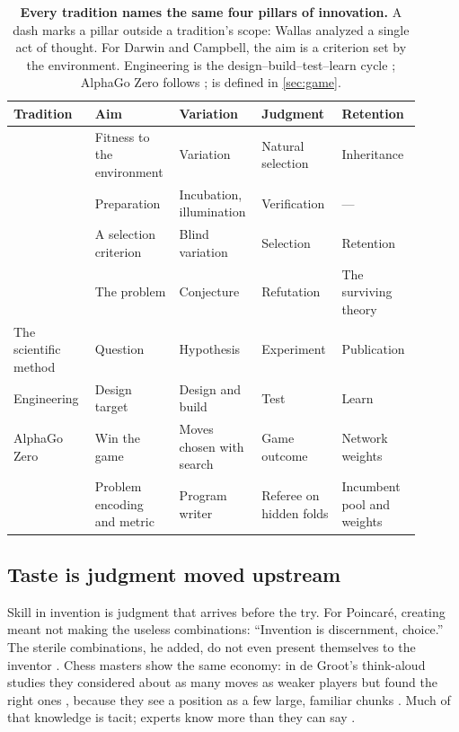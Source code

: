 \begin{table}[t]
  \caption{\textbf{Every tradition names the same four pillars of innovation.} A dash marks a pillar outside a tradition's scope: Wallas analyzed a single act of thought. For Darwin and Campbell, the aim is a criterion set by the environment. Engineering is the design--build--test--learn cycle \citep{nielsen2016engineering}; AlphaGo Zero follows \citet{silver2017mastering}; \EZ{} is defined in \cref{sec:game}.}
  \label{tab:pillars}
  \centering
  \footnotesize
  \begin{tabular}{@{}>{\raggedright\arraybackslash}p{0.19\linewidth}>{\raggedright\arraybackslash}p{0.18\linewidth}>{\raggedright\arraybackslash}p{0.17\linewidth}>{\raggedright\arraybackslash}p{0.17\linewidth}>{\raggedright\arraybackslash}p{0.185\linewidth}@{}}
    \toprule
    Tradition & Aim & Variation & Judgment & Retention \\
    \midrule
    \citet{darwin1859origin} & Fitness to the environment & Variation & Natural selection & Inheritance \\
    \citet{wallas1926art} & Preparation & Incubation, illumination & Verification & --- \\
    \citet{campbell1960bvsr} & A selection criterion & Blind variation & Selection & Retention \\
    \citet{popper1963conjectures} & The problem & Conjecture & Refutation & The surviving theory \\
    The scientific method & Question & Hypothesis & Experiment & Publication \\
    Engineering & Design target & Design and build & Test & Learn \\
    AlphaGo Zero & Win the game & Moves chosen with search & Game outcome & Network weights \\
    \addlinespace
    \EZ{} & Problem encoding and metric & Program writer & Referee on hidden folds & Incumbent pool and weights \\
    \bottomrule
  \end{tabular}
\end{table}

\subsection{Taste is judgment moved upstream}\label{sub:anatomy-taste}

Skill in invention is judgment that arrives before the try. For Poincaré, creating meant not making the useless combinations: ``Invention is discernment, choice.'' The sterile combinations, he added, do not even present themselves to the inventor \citep[pp.~324--325]{poincare1910creation}. Chess masters show the same economy: in de Groot's think-aloud studies they considered about as many moves as weaker players but found the right ones \citep{degroot1965thought}, because they see a position as a few large, familiar chunks \citep{chase1973perception}. Much of that knowledge is tacit; experts know more than they can say \citep{polanyi1966tacit}.

